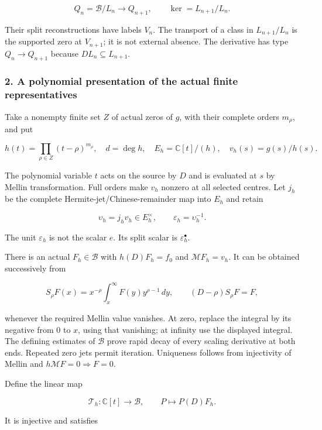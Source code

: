 \[Q_n=\mathscr B/L_n\longrightarrow Q_{n+1},\qquad\ker= L_{n+1}/L_n.\tag{1.3}\]

Their split reconstructions have labels \(V_n\). The transport of a
class in \(L_{n+1}/L_n\) is the supported zero at \(V_{n+1}\); it is not
external absence. The derivative has type \(Q_n\to Q_{n+1}\) because
\(DL_n\subseteq L_{n+1}\).

\subsubsection{2. A polynomial presentation of the actual finite
representatives}\label{pr_14:a-polynomial-presentation-of-the-actual-finite-representatives}

Take a nonempty finite set \(Z\) of actual zeros of \(g\), with their
complete orders \(m_\rho\), and put

\[h(t)=\prod_{\rho\in Z}(t-\rho)^{m_\rho},\quad d=\deg h,\quad E_h=\mathbb C[t]/(h),\quad v_h(s)=g(s)/h(s).\tag{2.1}\]

The polynomial variable \(t\) acts on the source by \(D\) and is
evaluated at \(s\) by Mellin transformation. Full orders make \(v_h\)
nonzero at all selected centres. Let \(j_h\) be the complete
Hermite-jet/Chinese-remainder map into \(E_h\) and retain

\[\upsilon_h=j_hv_h\in E_h^\times,\qquad\varepsilon_h=\upsilon_h^{-1}.\tag{2.2}\]

The unit \(\varepsilon_h\) is not the scalar \(e\). Its split scalar is
\(\varepsilon_h^\bullet\).

There is an actual \(F_h\in\mathscr B\) with \(h(D)F_h=f_0\) and
\(\mathcal MF_h=v_h\). It can be obtained successively from

\[S_\rho F(x)=x^{-\rho}\int_x^\infty F(y)y^{\rho-1}\,dy,\qquad(D-\rho)S_\rho F=F,\tag{2.3}\]

whenever the required Mellin value vanishes. At zero, replace the
integral by its negative from \(0\) to \(x\), using that vanishing; at
infinity use the displayed integral. The defining estimates of
\(\mathscr B\) prove rapid decay of every scaling derivative at both
ends. Repeated zero jets permit iteration. Uniqueness follows from
injectivity of Mellin and \(h\mathcal MF=0\Rightarrow F=0\).

Define the linear map

\[\boxed{\mathcal T_h:\mathbb C[t]\longrightarrow\mathscr B,\qquad P\longmapsto P(D)F_h.}\tag{2.4}\]

It is injective and satisfies


